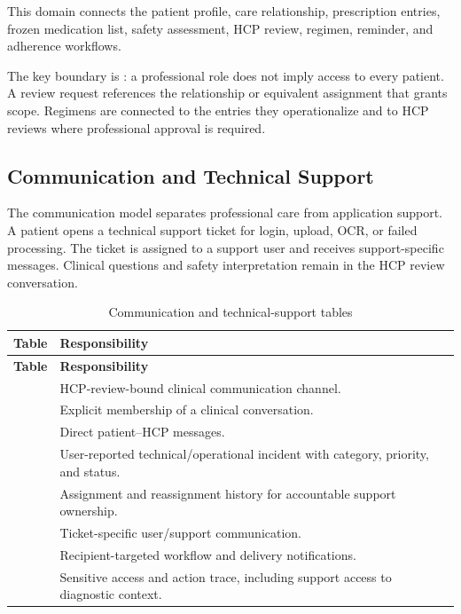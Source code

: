 This domain connects the patient profile, care relationship, prescription entries, frozen medication list, safety assessment, HCP review, regimen, reminder, and adherence workflows.


The key boundary is : a professional role does not imply access to every patient. A review request references the relationship or equivalent assignment that grants scope. Regimens are connected to the entries they operationalize and to HCP reviews where professional approval is required.

\subsection{Communication and Technical Support}

The communication model separates professional care from application support. A patient opens a technical support ticket for login, upload, OCR, or failed processing. The ticket is assigned to a support user and receives support-specific messages. Clinical questions and safety interpretation remain in the HCP review conversation.


\begin{longtable}{L{4.5cm}L{10.8cm}}
\caption{Communication and technical-support tables}\label{tab:support-tables}\\
\toprule
\textbf{Table} & \textbf{Responsibility}\\
\midrule
\endfirsthead
\toprule
\textbf{Table} & \textbf{Responsibility}\\
\midrule
\endhead
{} & HCP-review-bound clinical communication channel.\\
 & Explicit membership of a clinical conversation.\\
 & Direct patient--HCP messages.\\
 & User-reported technical/operational incident with category, priority, and status.\\
 & Assignment and reassignment history for accountable support ownership.\\
 & Ticket-specific user/support communication.\\
 & Recipient-targeted workflow and delivery notifications.\\
 & Sensitive access and action trace, including support access to diagnostic context.\\
\bottomrule
\end{longtable}

